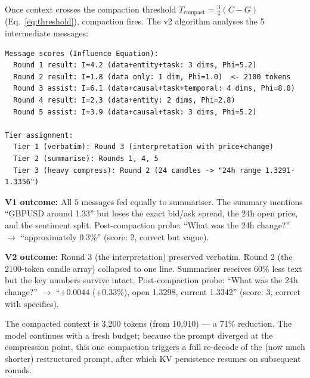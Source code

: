 \documentclass[11pt,a4paper]{article}
\begin{document}
\noindent Once context crosses the compaction threshold $T_{\text{compact}} = \frac{3}{4}(C-G)$ (Eq.~\ref{eq:threshold}), compaction fires. The v2 algorithm analyses the 5 intermediate messages:

\begin{small}
\begin{verbatim}
Message scores (Influence Equation):
  Round 1 result: I=4.2 (data+entity+task: 3 dims, Phi=5.2)
  Round 2 result: I=1.8 (data only: 1 dim, Phi=1.0)  <- 2100 tokens
  Round 3 assist: I=6.1 (data+causal+task+temporal: 4 dims, Phi=8.0)
  Round 4 result: I=2.3 (data+entity: 2 dims, Phi=2.8)
  Round 5 assist: I=3.9 (data+causal+task: 3 dims, Phi=5.2)

Tier assignment:
  Tier 1 (verbatim): Round 3 (interpretation with price+change)
  Tier 2 (summarise): Rounds 1, 4, 5
  Tier 3 (heavy compress): Round 2 (24 candles -> "24h range 1.3291-1.3356")
\end{verbatim}
\end{small}

\noindent \textbf{V1 outcome:} All 5 messages fed equally to summariser. The summary mentions ``GBPUSD around 1.33'' but loses the exact bid/ask spread, the 24h open price, and the sentiment split. Post-compaction probe: ``What was the 24h change?'' $\to$ ``approximately 0.3\%'' (score: 2, correct but vague).

\textbf{V2 outcome:} Round 3 (the interpretation) preserved verbatim. Round 2 (the 2100-token candle array) collapsed to one line. Summariser receives 60\% less text but the key numbers survive intact. Post-compaction probe: ``What was the 24h change?'' $\to$ ``+0.0044 (+0.33\%), open 1.3298, current 1.3342'' (score: 3, correct with specifics).

\noindent The compacted context is 3,200 tokens (from 10,910) --- a 71\% reduction. The model continues with a fresh budget; because the prompt diverged at the compression point, this one compaction triggers a full re-decode of the (now much shorter) restructured prompt, after which KV persistence resumes on subsequent rounds.

\end{document}
